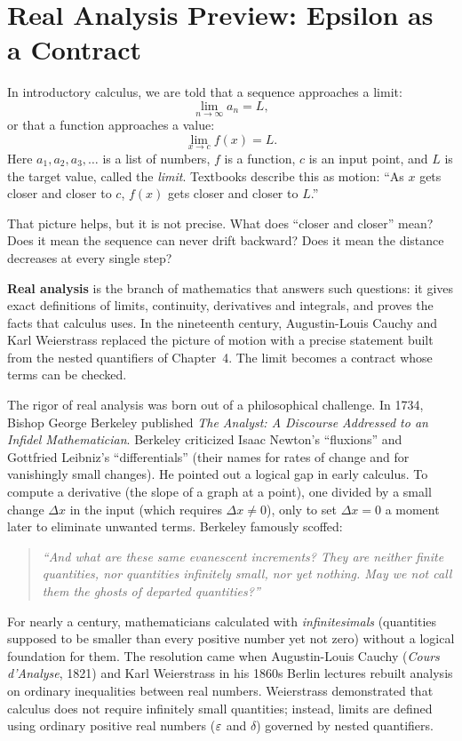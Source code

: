 \section{Real Analysis Preview: Epsilon as a Contract}
\chapterline

In introductory calculus, we are told that a sequence approaches a limit:
\[
\lim_{n \to \infty} a_n = L,
\]
or that a function approaches a value:
\[
\lim_{x \to c} f(x) = L.
\]
Here $a_1, a_2, a_3, \dots$ is a list of numbers, $f$ is a function, $c$ is an input point, and $L$ is the target value, called the \emph{limit}. Textbooks describe this as motion: ``As $x$ gets closer and closer to $c$, $f(x)$ gets closer and closer to $L$.''

That picture helps, but it is not precise. What does ``closer and closer'' mean? Does it mean the sequence can never drift backward? Does it mean the distance decreases at every single step? 

\textbf{Real analysis} is the branch of mathematics that answers such questions: it gives exact definitions of limits, continuity, derivatives and integrals, and proves the facts that calculus uses. In the nineteenth century, Augustin-Louis Cauchy and Karl Weierstrass replaced the picture of motion with a precise statement built from the nested quantifiers of Chapter~4. The limit becomes a contract whose terms can be checked.

\begin{historybox}
The rigor of real analysis was born out of a philosophical challenge. In 1734, Bishop George Berkeley published \emph{The Analyst: A Discourse Addressed to an Infidel Mathematician}. Berkeley criticized Isaac Newton's ``fluxions'' and Gottfried Leibniz's ``differentials'' (their names for rates of change and for vanishingly small changes). He pointed out a logical gap in early calculus. To compute a derivative (the slope of a graph at a point), one divided by a small change $\Delta x$ in the input (which requires $\Delta x \neq 0$), only to set $\Delta x = 0$ a moment later to eliminate unwanted terms. Berkeley famously scoffed:
\begin{quote}
\itshape
``And what are these same evanescent increments? They are neither finite quantities, nor quantities infinitely small, nor yet nothing. May we not call them the ghosts of departed quantities?''
\end{quote}
For nearly a century, mathematicians calculated with \emph{infinitesimals} (quantities supposed to be smaller than every positive number yet not zero) without a logical foundation for them. The resolution came when Augustin-Louis Cauchy (\emph{Cours d'Analyse}, 1821) and Karl Weierstrass in his 1860s Berlin lectures rebuilt analysis on ordinary inequalities between real numbers. Weierstrass demonstrated that calculus does not require infinitely small quantities; instead, limits are defined using ordinary positive real numbers ($\varepsilon$ and $\delta$) governed by nested quantifiers.
\end{historybox}

